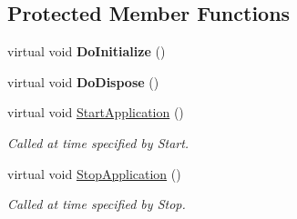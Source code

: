 \subsection*{Protected Member Functions}
\begin{DoxyCompactItemize}
\item 
virtual void {\bfseries Do\+Initialize} ()\hypertarget{classns3_1_1ndn_1_1App_a48f6595605db3186d9cdca77a3247886}{}\label{classns3_1_1ndn_1_1App_a48f6595605db3186d9cdca77a3247886}

\item 
virtual void {\bfseries Do\+Dispose} ()\hypertarget{classns3_1_1ndn_1_1App_aa60240fd0f101d9845f813e63dfb34fd}{}\label{classns3_1_1ndn_1_1App_aa60240fd0f101d9845f813e63dfb34fd}

\item 
virtual void \hyperlink{classns3_1_1ndn_1_1App_a20fd3ef630b6d05dc139911d1ef1b17f}{Start\+Application} ()\hypertarget{classns3_1_1ndn_1_1App_a20fd3ef630b6d05dc139911d1ef1b17f}{}\label{classns3_1_1ndn_1_1App_a20fd3ef630b6d05dc139911d1ef1b17f}

\begin{DoxyCompactList}\small\item\em Called at time specified by Start. \end{DoxyCompactList}\item 
virtual void \hyperlink{classns3_1_1ndn_1_1App_af1efb7281aa29014eb4574ce452dc705}{Stop\+Application} ()\hypertarget{classns3_1_1ndn_1_1App_af1efb7281aa29014eb4574ce452dc705}{}\label{classns3_1_1ndn_1_1App_af1efb7281aa29014eb4574ce452dc705}

\begin{DoxyCompactList}\small\item\em Called at time specified by Stop. \end{DoxyCompactList}\end{DoxyCompactItemize}
